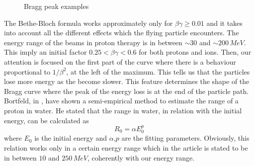 \documentclass[12pt, a4paper, twoside]{book}
\begin{document}
\begin{figure}[!ht]
     \hfill
\hspace{2mm}
\caption{Bragg peak examples}
   \end{figure}
The Bethe-Bloch formula works approximately only for $\beta\gamma\ge 0.01$ and it takes into account all the different effects which the flying particle encounters. The energy range of the beams in proton therapy is in between $\sim30$ and $\sim200\,MeV$. This imply an initial factor $0.25<\beta\gamma<0.6$ for both protons and ions. Then, our attention is focused on the first part of the curve where there is a behaviour proportional to $1/\beta^2$, at the left of the maximum. This tells us that the particles lose more energy as the become slower. This feature determines the shape of the Bragg curve where the peak of the energy loss is at the end of the particle path.
Bortfeld, in \cite{bort:bragg}, have shown a semi-empirical method to estimate the range of a proton in water. He stated that the range in water, in relation with the initial energy, can be calculated as
\[
R_0 = \alpha E_0^p
\]
where $E_0$ is the initial energy and $\alpha$,$p$ are the fitting parameters. Obviously, this relation works only in a certain energy range which in the article is stated to be in between $10$ and $250\,MeV$, coherently with our energy range.
\end{document}
